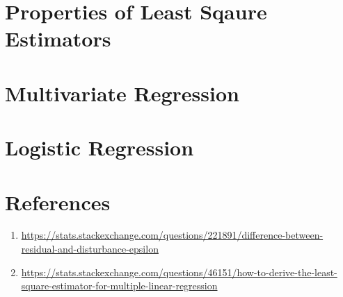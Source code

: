 \section{Properties of  Least Sqaure Estimators}
\section{Multivariate Regression}
\section{Logistic Regression}
\section{References}
\begin{enumerate}
    \item \url{https://stats.stackexchange.com/questions/221891/difference-between-residual-and-disturbance-epsilon}
    \item \url{https://stats.stackexchange.com/questions/46151/how-to-derive-the-least-square-estimator-for-multiple-linear-regression}
\end{enumerate}

